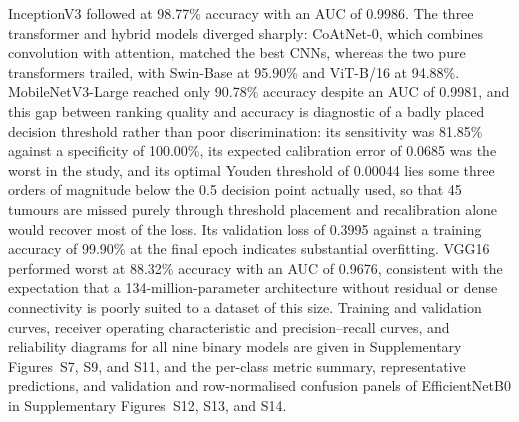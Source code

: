 \documentclass[final,3p,times,number]{elsarticle}
\begin{document}
InceptionV3 followed at 98.77\% accuracy with an AUC of 0.9986. The three transformer and hybrid models diverged sharply: CoAtNet-0, which combines convolution with attention, matched the best CNNs, whereas the two pure transformers trailed, with Swin-Base at 95.90\% and ViT-B/16 at 94.88\%. MobileNetV3-Large reached only 90.78\% accuracy despite an AUC of 0.9981, and this gap between ranking quality and accuracy is diagnostic of a badly placed decision threshold rather than poor discrimination: its sensitivity was 81.85\% against a specificity of 100.00\%, its expected calibration error of 0.0685 was the worst in the study, and its optimal Youden threshold of 0.00044 lies some three orders of magnitude below the 0.5 decision point actually used, so that 45 tumours are missed purely through threshold placement and recalibration alone would recover most of the loss. Its validation loss of 0.3995 against a training accuracy of 99.90\% at the final epoch indicates substantial overfitting. VGG16 performed worst at 88.32\% accuracy with an AUC of 0.9676, consistent with the expectation that a 134-million-parameter architecture without residual or dense connectivity is poorly suited to a dataset of this size. Training and validation curves, receiver operating characteristic and precision--recall curves, and reliability diagrams for all nine binary models are given in Supplementary Figures~S7, S9, and S11, and the per-class metric summary, representative predictions, and validation and row-normalised confusion panels of EfficientNetB0 in Supplementary Figures~S12, S13, and S14.
\end{document}

